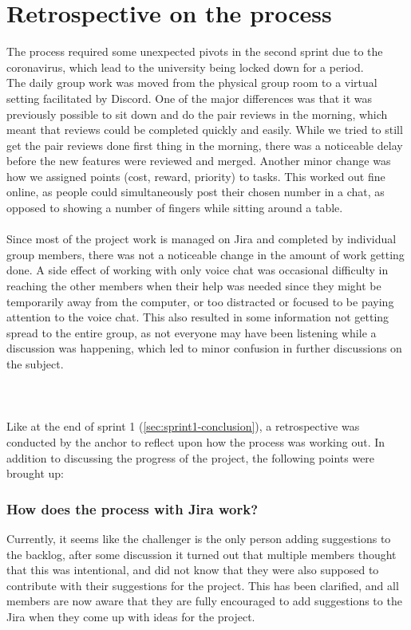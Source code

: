 \section{Retrospective on the process}
The process required some unexpected pivots in the second sprint due to the coronavirus, which lead to the university being locked down for a period.
\\
The daily group work was moved from the physical group room to a virtual setting facilitated by Discord.
One of the major differences was that it was previously possible to sit down and do the pair reviews in the morning, which meant that reviews could be completed quickly and easily.
While we tried to still get the pair reviews done first thing in the morning, there was a noticeable delay before the new features were reviewed and merged.
Another minor change was how we assigned points (cost, reward, priority) to tasks. This worked out fine online, as people could simultaneously post their chosen number in a chat, as opposed to showing a number of fingers while sitting around a table.
\\\\
Since most of the project work is managed on Jira and completed by individual group members, there was not a noticeable change in the amount of work getting done.
A side effect of working with only voice chat was occasional difficulty in reaching the other members when their help was needed since they might be temporarily away from the computer, or too distracted or focused to be paying attention to the voice chat.
This also resulted in some information not getting spread to the entire group, as not everyone may have been listening while a discussion was happening, which led to minor confusion in further discussions on the subject.\\\\
\\\\
Like at the end of sprint 1 (\autoref{sec:sprint1-conclusion}), a retrospective was conducted by the anchor to reflect upon how the process was working out.
In addition to discussing the progress of the project, the following points were brought up:

\subsubsection{How does the process with Jira work?}
Currently, it seems like the challenger is the only person adding suggestions to the backlog, after some discussion it turned out that multiple members thought that this was intentional, and did not know that they were also supposed to contribute with their suggestions for the project.
This has been clarified, and all members are now aware that they are fully encouraged to add suggestions to the Jira when they come up with ideas for the project.

